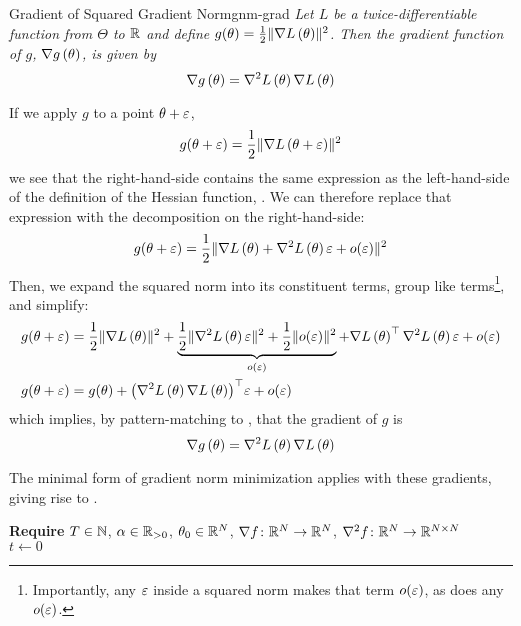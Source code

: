 \documentclass[../../thesis.tex]{subfiles}
\begin{document}
\begin{theorem}{Gradient of Squared Gradient Norm}{gnm-grad}
	\emph{Let $L$ be a twice-differentiable function
	from $\Theta$ to $\mathbb{R}$
	and define $g(\theta) = \frac{1}{2}\lVert\nabla L\left(\theta\right)\rVert^2$.
	Then the gradient function of $g$, $\nabla g\left(\theta\right)$,
	is given by
	\begin{equation}
		\nabla g\left(\theta\right) = \nabla^2L\left(\theta\right)\nabla L\left(\theta\right)
	\end{equation}
	}

	If we apply $g$ to a point $\theta + \varepsilon$,
	\begin{equation}
		g(\theta + \varepsilon) = \frac{1}{2}\lVert\nabla L\left(\theta + \varepsilon\right)\rVert^2
	\end{equation}
	\noindent we see that the right-hand-side
	contains the same expression as the left-hand-side
	of the definition of the Hessian function,
	.
	We can therefore replace that expression
	with the decomposition on the right-hand-side:
	\begin{equation}
		g(\theta + \eps) = \frac{1}{2}\snorm{%
		\grad{L}{\theta} + \hess{L}{\theta}\epsilon + o(\epsilon)}
	\end{equation}
	\noindent Then, we expand the squared norm into its constituent terms,
	group like terms\footnote{%
		Importantly, any $\varepsilon$ inside a squared norm makes that term $o(\varepsilon)$,
	as does any $o(\varepsilon)$.},
	and simplify:
	\begin{align}
		g(\theta + \varepsilon) &= \frac{1}{2}\lVert\nabla L\left(\theta\right)\rVert^2
		+ \underbrace{\frac{1}{2}\lVert\nabla^2L\left(\theta\right)\varepsilon\rVert^2
		+ \frac{1}{2}\lVert o(\varepsilon)\rVert^2}_{o(\varepsilon)}
		+ \nabla L\left(\theta\right)^\top\nabla^2L\left(\theta\right)\varepsilon
		+ o(\varepsilon)\\
		g(\theta + \varepsilon) &= g(\theta)
		+ {\left(\nabla^2L\left(\theta\right)\nabla L\left(\theta\right)\right)}^\top\varepsilon
		+ o(\varepsilon)
	\end{align}
	\noindent which implies,
	by pattern-matching to ,
	that the gradient of $g$ is
	\begin{equation}\equationlabel{gnm-grad}
		\grad{g}{\theta} = \hess{L}{\theta}\grad{L}{\theta}
	\end{equation}
\end{theorem}

The minimal form of gradient norm minimization
applies  with these gradients,
giving rise to .

\begin{algorithm}[H]
    \SetAlgoLined{}
    \textbf{Require}
    $T\in \mathbb{N}$, $\alpha \in \mathbb{R}_{>0}$, $\theta_0 \in \mathbb{R}^N$,
    $\nabla{f}\colon\mathbb{R}^N\to\mathbb{R}^N$,
    $\nabla^2{f}\colon\mathbb{R}^N\to\mathbb{R}^{N\times N}$\\
    $t \leftarrow 0$\\
    \caption{Gradient Norm Minimization by Gradient Descent}
\end{algorithm}
\end{document}
